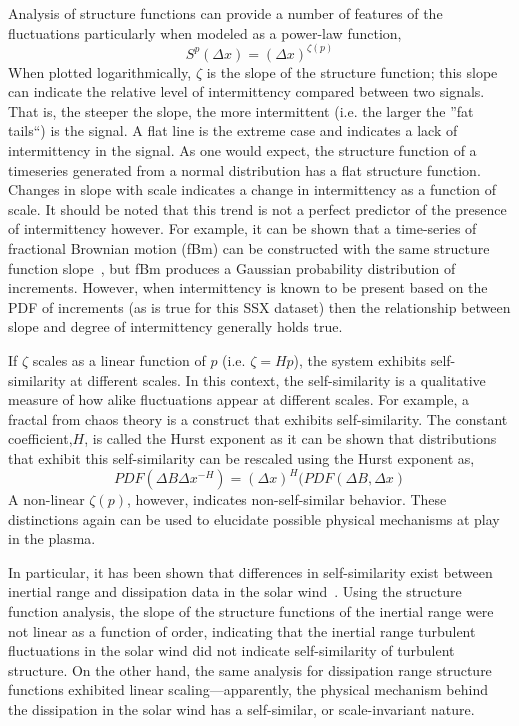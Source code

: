 \documentclass[aps,prl,amsmath,amssymb,reprint,superscriptaddress]{revtex4-1} %
\begin{document}
Analysis of structure functions can provide a number of features of the fluctuations particularly when modeled as a power-law function,
\begin{equation}
S^{p}(\Delta x) = (\Delta x)^{\zeta(p)}
\label{eq:power-law}
\end{equation}
When plotted logarithmically, $\zeta$ is the slope of the structure function; this slope can indicate the relative level of intermittency compared between two signals. That is, the steeper the slope, the more intermittent (i.e. the larger the ''fat tails``) is the signal. A flat line is the extreme case and indicates a lack of intermittency in the signal. As one would expect, the structure function of a timeseries generated from a normal distribution has a flat structure function. Changes in slope with scale indicates a change in intermittency as a function of scale. It should be noted that this trend is not a perfect predictor of the presence of intermittency however. For example, it can be shown that a time-series of fractional Brownian motion (fBm) can be constructed with the same structure function slope~\cite{hnat2003}, but fBm produces a Gaussian probability distribution of increments. However, when intermittency is known to be present based on the PDF of increments (as is true for this SSX dataset) then the relationship between slope and degree of intermittency generally holds true.

If $\zeta$ scales as a linear function of $p$ (i.e. $\zeta = Hp$), the system exhibits self-similarity at different scales. In this context, the self-similarity is a qualitative measure of how alike fluctuations appear at different scales. For example, a fractal from chaos theory is a construct that exhibits self-similarity. The constant coefficient,$H$, is called the Hurst exponent as it can be shown that distributions that exhibit this self-similarity can be rescaled using the Hurst exponent as,
\begin{equation}
PDF(\Delta B\Delta x^{-H}) = (\Delta x)^H(PDF(\Delta B,\Delta x)
\label{eq:scaling}
\end{equation}
A non-linear $\zeta(p)$, however, indicates non-self-similar behavior. These distinctions again can be used to elucidate possible physical mechanisms at play in the plasma. 

In particular, it has been shown that differences in self-similarity exist between inertial range and dissipation data in the solar wind~\cite{kiyani2009,kiyani2013}. Using the structure function analysis, the slope of the structure functions of the inertial range were not linear as a function of order, indicating that the inertial range turbulent fluctuations in the solar wind did not indicate self-similarity of turbulent structure. On the other hand, the same analysis for dissipation range structure functions exhibited linear scaling---apparently, the physical mechanism behind the dissipation in the solar wind has a self-similar, or scale-invariant nature.
\end{document}
